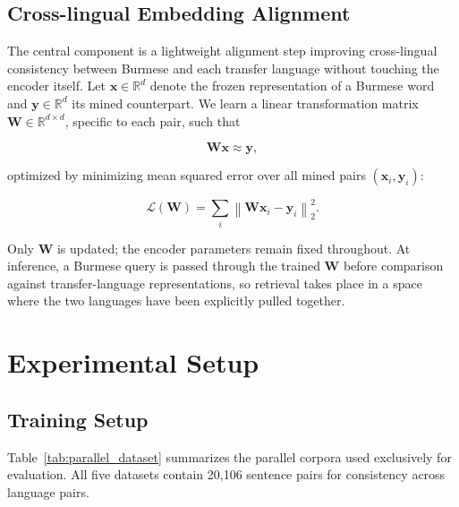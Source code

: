 \documentclass[11pt]{article}
\begin{document}
\subsection{Cross-lingual Embedding Alignment}
\label{sec:alignment}

The central component is a lightweight alignment step improving cross-lingual consistency between Burmese and each transfer language without touching the encoder itself. Let $\mathbf{x} \in \mathbb{R}^{d}$ denote the frozen representation of a Burmese word and $\mathbf{y} \in \mathbb{R}^{d}$ its mined counterpart. We learn a linear transformation matrix $\mathbf{W} \in \mathbb{R}^{d \times d}$, specific to each pair, such that

\begin{equation}
\mathbf{W}\mathbf{x} \approx \mathbf{y},
\label{eq:map}
\end{equation}

optimized by minimizing mean squared error over all mined pairs $(\mathbf{x}_i, \mathbf{y}_i)$:

\begin{equation}
\mathcal{L}(\mathbf{W}) = \sum_{i} \left\lVert \mathbf{W}\mathbf{x}_i - \mathbf{y}_i \right\rVert_2^{2}.
\label{eq:loss}
\end{equation}

Only $\mathbf{W}$ is updated; the encoder parameters remain fixed throughout. At inference, a Burmese query is passed through the trained $\mathbf{W}$ before comparison against transfer-language representations, so retrieval takes place in a space where the two languages have been explicitly pulled together.

\section{Experimental Setup}
\label{sec:exp_setup}

\subsection{Training Setup}
\label{sec:datasets}

Table~\ref{tab:parallel_dataset} summarizes the parallel corpora used exclusively for evaluation. All five datasets contain 20,106 sentence pairs for consistency
across language pairs.
\end{document}
